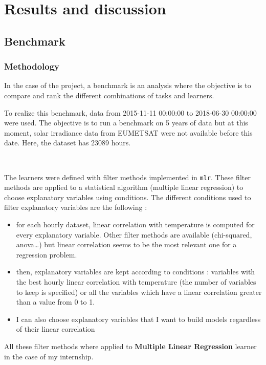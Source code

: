 \documentclass[12pt,twoside]{reedthesis}
\providecommand{\tightlist}{%
  \setlength{\itemsep}{0pt}\setlength{\parskip}{0pt}}
\theoremstyle{definition}
\theoremstyle{definition}
\theoremstyle{definition}
\theoremstyle{remark}
\begin{document}
\chapter{Results and discussion}\label{results}

\section{Benchmark}\label{benchmark}

\subsection{Methodology}\label{methodology}

In the case of the project, a benchmark is an analysis where the
objective is to compare and rank the different combinations of tasks and
learners.

To realize this benchmark, data from 2015-11-11 00:00:00 to 2018-06-30
00:00:00 were used. The objective is to run a benchmark on 5 years of
data but at this moment, solar irradiance data from EUMETSAT were not
available before this date. Here, the dataset has 23089 hours.

~

The learners were defined with filter methods implemented in
\texttt{mlr}. These filter methods are applied to a statistical
algorithm (multiple linear regression) to choose explanatory variables
using conditions. The different conditions used to filter explanatory
variables are the following :
\begin{itemize}
\tightlist
\item
  for each hourly dataset, linear correlation with temperature is
  computed for every explanatory variable. Other filter methods are
  available (chi-squared, anova\ldots{}) but linear correlation seems to
  be the most relevant one for a regression problem.
\item
  then, explanatory variables are kept according to conditions :
  variables with the best hourly linear correlation with temperature
  (the number of variables to keep is specified) or all the variables
  which have a linear correlation greater than a value from 0 to 1.
\item
  I can also choose explanatory variables that I want to build models
  regardless of their linear correlation
\end{itemize}
All these filter methods where applied to \textbf{Multiple Linear
Regression} learner in the case of my internship.
\end{document}
